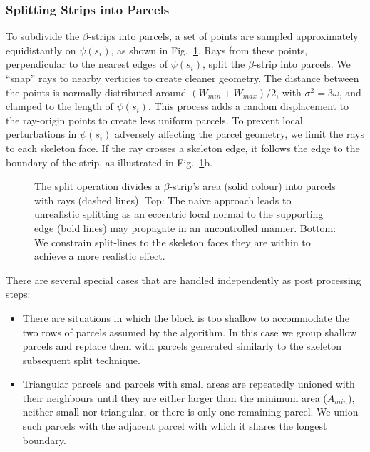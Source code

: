 

\subsubsection{Splitting Strips into Parcels}
\label{sec:skeletonSubsequent}

To subdivide the $\beta$-strips into parcels, a set of points are sampled approximately equidistantly on $\psi(s_i)$, as shown in Fig.~\ref{fig:slice2}. Rays from these points, perpendicular to the nearest edges of $\psi(s_i)$, split the $\beta$-strip into parcels. We ``snap'' rays to nearby verticies to create cleaner geometry. The distance between the points is normally distributed around $(W_{min} + W_{max})/{2}$, with $\sigma^2 = 3\omega$, and clamped to the length of $\psi(s_i)$. This process adds a random displacement to the ray-origin points to create less uniform parcels. 
To prevent local perturbations in $\psi(s_i)$ adversely affecting the parcel geometry, we limit the rays to each skeleton face. If the ray crosses a skeleton edge, it follows the edge to the boundary of the strip, as illustrated in Fig.~\ref{fig:slice2}b. 

\begin{figure}
\centering
\def\svgwidth{0.7\columnwidth}

\caption[A problem with naive strip splitting]{\label{fig:slice2}The split operation divides a $\beta$-strip's area (solid colour) into parcels with rays (dashed lines). Top: The naive approach leads to unrealistic splitting as an eccentric local normal to the supporting edge (bold lines) may propagate in an uncontrolled manner. Bottom: We constrain split-lines to the skeleton faces they are within to achieve a more realistic effect.}
\end{figure}

There are several special cases that are handled independently as post processing steps: %
\begin{itemize}
\item 
There are situations in which the block is too shallow to accommodate the two rows of parcels assumed by the algorithm. In this case we group shallow parcels and replace them with parcels generated similarly to the skeleton subsequent split technique. 

\item 
Triangular parcels and parcels with small areas are repeatedly unioned with their neighbours until they are either larger than the minimum area ($A_{min}$), neither small nor triangular, or there is only one remaining parcel. We union such parcels with the adjacent parcel with which it shares the longest boundary.
\end{itemize}

